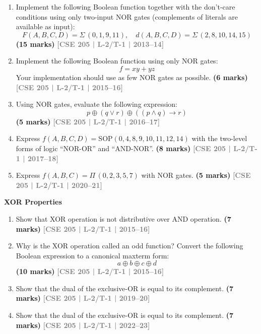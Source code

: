 \documentclass[12pt,a4paper]{article}
\newcommand{\yr}[1]{\hfill\textcolor{gray}{\small\textbf{[#1]}}}
\newcommand{\mk}[1]{\textcolor{orange!70!black}{\small\textbf{(#1 marks)}}}
\newcommand{\subtopic}[2]{%
  \vspace{10pt}
  \noindent\begin{tcolorbox}[colback=#1!8,colframe=#1,boxrule=0.6pt,arc=4pt,
    left=6pt,right=6pt,top=4pt,bottom=4pt]
    \small\bfseries\textcolor{#1}{#2}
  \end{tcolorbox}
  \vspace{2pt}
}
\begin{document}
\begin{enumerate}

\item Implement the following Boolean function together with the don't-care conditions using only two-input NOR gates (complements of literals are available as input):
\[ F(A,B,C,D) = \Sigma\,(0,1,9,11), \quad d(A,B,C,D) = \Sigma\,(2,8,10,14,15) \]
\mk{15} \yr{CSE 205 | L-2/T-1 | 2013--14}


\item Implement the following Boolean function using only NOR gates:
\[ f = xy + yz \]
Your implementation should use as few NOR gates as possible.
\mk{6} \yr{CSE 205 | L-2/T-1 | 2015--16}


\item Using NOR gates, evaluate the following expression:
\[ p \oplus (q \vee r) \oplus ((p \wedge q) \to r) \]
\mk{5} \yr{CSE 205 | L-2/T-1 | 2016--17}


\item Express $f(A,B,C,D) = \mathrm{SOP}(0,4,8,9,10,11,12,14)$ with the two-level forms of logic ``NOR-OR'' and ``AND-NOR''.
\mk{8} \yr{CSE 205 | L-2/T-1 | 2017--18}


\item Express $f(A, B, C) = \Pi\,(0, 2, 3, 5, 7)$ with NOR gates.
\mk{5} \yr{CSE 205 | L-2/T-1 | 2020--21}

\end{enumerate}

\subtopic{cA}{XOR Properties}
\label{sub:s1-xor}

\begin{enumerate}

\item Show that XOR operation is not distributive over AND operation.
\mk{7} \yr{CSE 205 | L-2/T-1 | 2015--16}


\item Why is the XOR operation called an odd function? Convert the following Boolean expression to a canonical maxterm form:
\[ a \oplus b \oplus c \oplus d \]
\mk{10} \yr{CSE 205 | L-2/T-1 | 2015--16}


\item Show that the dual of the exclusive-OR is equal to its complement.
\mk{7} \yr{CSE 205 | L-2/T-1 | 2019--20}

\item Show that the dual of the exclusive-OR is equal to its complement.
\mk{7} \yr{CSE 205 | L-2/T-1 | 2022--23}

\end{enumerate}
\end{document}
